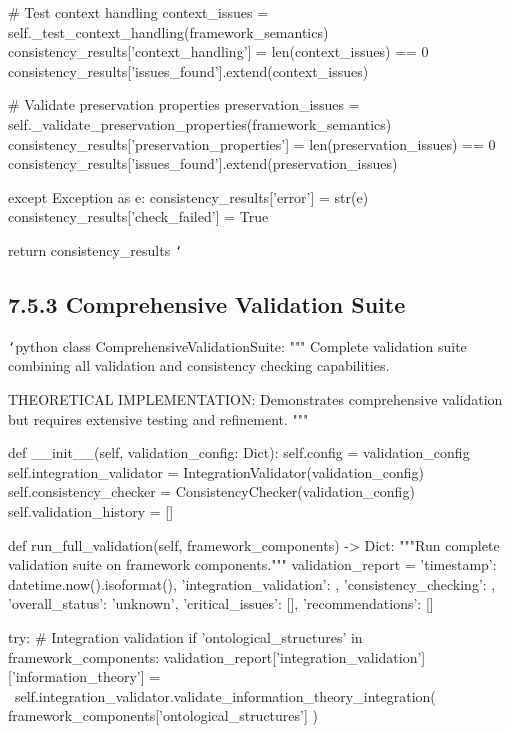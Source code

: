             \# Test context handling
            context_issues = self._test_context_handling(framework_semantics)
            consistency_results['context_handling'] = len(context_issues) == 0
            consistency_results['issues_found'].extend(context_issues)
            
            \# Validate preservation properties
            preservation_issues = self._validate_preservation_properties(framework_semantics)
            consistency_results['preservation_properties'] = len(preservation_issues) == 0
            consistency_results['issues_found'].extend(preservation_issues)
            
        except Exception as e:
            consistency_results['error'] = str(e)
            consistency_results['check_failed'] = True
            
        return consistency_results
\texttt{`}

\subsection{7.5.3 Comprehensive Validation Suite}

\texttt{`}python
class ComprehensiveValidationSuite:
    """
    Complete validation suite combining all validation and consistency checking capabilities.
    
    THEORETICAL IMPLEMENTATION: Demonstrates comprehensive validation
    but requires extensive testing and refinement.
    """
    
    def __init__(self, validation_config: Dict):
        self.config = validation_config
        self.integration_validator = IntegrationValidator(validation_config)
        self.consistency_checker = ConsistencyChecker(validation_config)
        self.validation_history = []
        
    def run_full_validation(self, framework_components) -> Dict:
        """Run complete validation suite on framework components."""
        validation_report = {
            'timestamp': datetime.now().isoformat(),
            'integration_validation': {},
            'consistency_checking': {},
            'overall_status': 'unknown',
            'critical_issues': [],
            'recommendations': []
        }
        
        try:
            \# Integration validation
            if 'ontological_structures' in framework_components:
                validation_report['integration_validation']['information_theory'] = \
                    self.integration_validator.validate_information_theory_integration(
                        framework_components['ontological_structures']
                    )
                    
